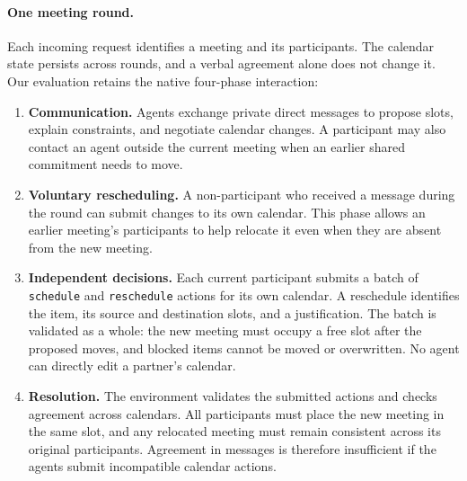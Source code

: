 \paragraph{One meeting round.}
Each incoming request identifies a meeting and its participants. The calendar
state persists across rounds, and a verbal agreement alone does not change
it. Our evaluation retains the native four-phase interaction:
\begin{enumerate}
\item \textbf{Communication.} Agents exchange private direct messages to
propose slots, explain constraints, and negotiate calendar changes. A
participant may also contact an agent outside the current meeting when an
earlier shared commitment needs to move.
\item \textbf{Voluntary rescheduling.} A non-participant who received a
message during the round can submit changes to its own calendar. This phase
allows an earlier meeting's participants to help relocate it even when they
are absent from the new meeting.
\item \textbf{Independent decisions.} Each current participant submits a
batch of \texttt{schedule} and \texttt{reschedule} actions for its own calendar.
A reschedule identifies the item, its source and destination slots, and a
justification. The batch is validated as a whole: the new meeting must occupy
a free slot after the proposed moves, and blocked items cannot be moved or
overwritten. No agent can directly edit a partner's calendar.
\item \textbf{Resolution.} The environment validates the submitted actions
and checks agreement across calendars. All participants must place the new
meeting in the same slot, and any relocated meeting must remain consistent
across its original participants. Agreement in messages is therefore
insufficient if the agents submit incompatible calendar actions.
\end{enumerate}

